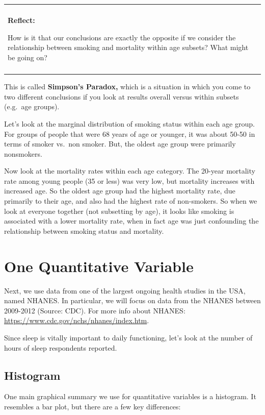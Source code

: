 \documentclass[]{book}
\newenvironment{reflect}
{
    \begin{center}
    
    \begin{tabular}{|p{0.8\textwidth}|}
    \rowcolor{LightBlue}
    \hline\\
    \rowcolor{LightBlue}
    \textbf{Reflect:}
}
{
    \\\rowcolor{LightBlue}
    \\\hline
    \end{tabular} 
    \end{center}
}
\begin{document}
\begin{reflect}
How is it that our conclusions are exactly the opposite if we consider
the relationship between smoking and mortality within age subsets? What
might be going on?
\end{reflect}

This is called \textbf{Simpson's Paradox,} which is a situation in which you come to two different conclusions if you look at results overall versus within subsets (e.g.~age groups).

Let's look at the marginal distribution of smoking status within each age group. For groups of people that were 68 years of age or younger, it was about 50-50 in terms of smoker vs.~non smoker. But, the oldest age group were primarily nonsmokers.

Now look at the mortality rates within each age category. The 20-year mortality rate among young people (35 or less) was very low, but mortality increases with increased age. So the oldest age group had the highest mortality rate, due primarily to their age, and also had the highest rate of non-smokers. So when we look at everyone together (not subsetting by age), it looks like smoking is associated with a lower mortality rate, when in fact age was just confounding the relationship between smoking status and mortality.

\hypertarget{one-quantitative-variable}{%
\section{One Quantitative Variable}\label{one-quantitative-variable}}

Next, we use data from one of the largest ongoing health studies in the USA, named NHANES. In particular, we will focus on data from the NHANES between 2009-2012 (Source: CDC). For more info about NHANES: \url{https://www.cdc.gov/nchs/nhanes/index.htm}.

Since sleep is vitally important to daily functioning, let's look at the number of hours of sleep respondents reported.

\hypertarget{histogram}{%
\subsection{Histogram}\label{histogram}}

One main graphical summary we use for quantitative variables is a histogram. It resembles a bar plot, but there are a few key differences:
\end{document}
